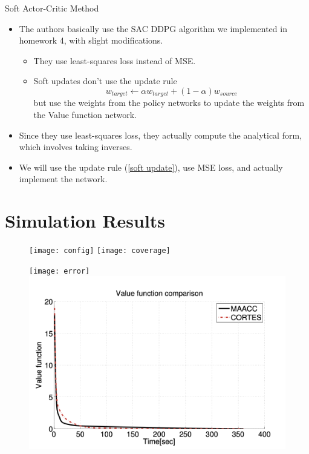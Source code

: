 \documentclass[9pt]{beamer}
\begin{document}
\begin{frame}{Soft Actor-Critic Method}
	\begin{itemize}
		\item The authors basically use the SAC DDPG algorithm we implemented in homework 4, with slight modifications.
		\begin{itemize}
			\item They use least-squares loss instead of MSE. 
			\item Soft updates don't use the update rule 
				\begin{equation}
					\label{soft update}
					w_{target} \leftarrow \alpha w_{target} + (1 - \alpha) w_{source} 
				\end{equation}
				but use the weights from the policy networks to update the weights from the Value function network. 
		\end{itemize}
		\item Since they use least-squares loss, they actually compute the analytical form, which involves taking inverses.
		\item We will use the update rule (\ref{soft update}), use MSE loss, and actually implement the network.
	\end{itemize}
\end{frame}
\section{Simulation Results}
\begin{frame}
	\begin{figure}[H]
		\centering 
		\texttt{[image: config]}
		\texttt{[image: coverage]}
	\end{figure}
	\begin{figure}[H]
		\centering 
		\texttt{[image: error]}
		\centering 
		\includegraphics[scale=0.2]{value}
	\end{figure}
\end{frame}
\end{document}
